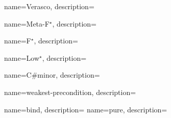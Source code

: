 
\usepackage{glossaries}
\usepackage{csquotes}
\makeglossaries


{
    name=Verasco,
    description={}
}
 
{
    name=Meta-F$^\star$,
    description={}
}

{
    name=F$^\star$,
    description={}
}

{
    name=Low$^\star$,
    description={}
}


{
    name=C\#minor,
    description={}
}

\def\verasco{\gls{verasco}}
\def\fstar{\gls{fstar}}

{
        name=weakest-precondition,
        description={}
}

{
    name=bind,
    description={}
}
{
    name=pure,
    description={}
}

